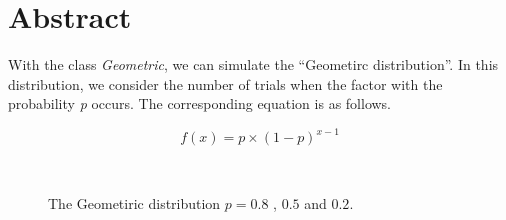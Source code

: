 %

\section{Abstract}

\noindent
With the class {\em Geometric}, we can simulate the ``Geometirc
distribution''. In this distribution, we consider the number of trials
when the factor with the probability {\em p} occurs. The corresponding
equation is as follows.

\begin{equation}
f(x) = p \times ( 1 - p )^{x-1}
\end{equation}

\vspace*{10mm}

\begin{center}
\begin{figure}[h]
\\
\caption{The Geometiric distribution $p = 0.8$ , $0.5$ and $0.2$.}
\end{figure}
\end{center}


